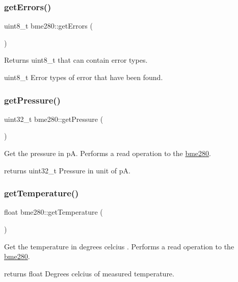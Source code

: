 \subsubsection{\texorpdfstring{get\+Errors()}{getErrors()}}
{\footnotesize\ttfamily uint8\+\_\+t bme280\+::get\+Errors (\begin{DoxyParamCaption}{ }\end{DoxyParamCaption})}



Returns uint8\+\_\+t that can contain error types. 

uint8\+\_\+t Error types of error that have been found. \mbox{\label{classbme280_a378fe9af89027338551cbef4361afec4}} 
\subsubsection{\texorpdfstring{get\+Pressure()}{getPressure()}}
{\footnotesize\ttfamily uint32\+\_\+t bme280\+::get\+Pressure (\begin{DoxyParamCaption}{ }\end{DoxyParamCaption})}



Get the pressure in pA. Performs a read operation to the \hyperlink{classbme280}{bme280}. 

returns uint32\+\_\+t Pressure in unit of pA. \mbox{\label{classbme280_a6b62bc13a120c4764d8655a2a4213282}} 
\subsubsection{\texorpdfstring{get\+Temperature()}{getTemperature()}}
{\footnotesize\ttfamily float bme280\+::get\+Temperature (\begin{DoxyParamCaption}{ }\end{DoxyParamCaption})}



Get the temperature in degrees celcius . Performs a read operation to the \hyperlink{classbme280}{bme280}. 

returns float Degrees celcius of measured temperature. \mbox{\label{classbme280_a4fb6f417fb29b6c5a30519e2599ff489}} 
